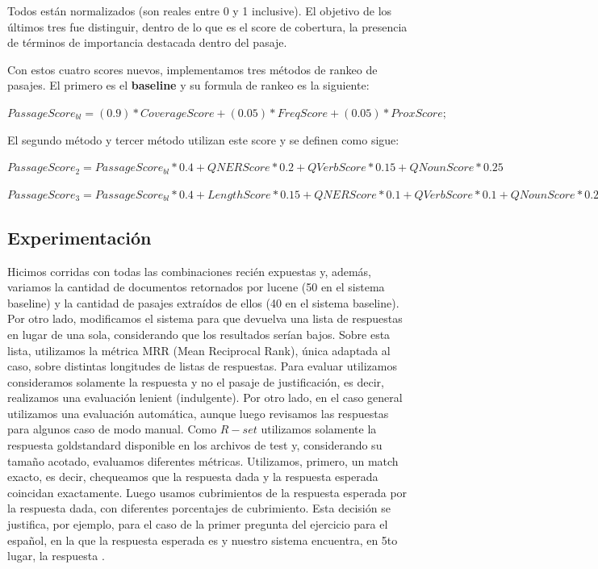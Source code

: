 Todos están normalizados (son reales entre 0 y 1 inclusive). El objetivo de los últimos tres fue distinguir, dentro de lo que es el score de cobertura, la presencia de términos de importancia destacada dentro del pasaje.


Con estos cuatro scores nuevos, implementamos tres métodos de rankeo de pasajes. El primero es el \textbf{baseline} y su formula de rankeo es la siguiente: \newline

$PassageScore_{bl} = (0.9)*CoverageScore + (0.05)*FreqScore+ (0.05)*ProxScore;$ \newline

El segundo método y tercer método utilizan este score y se definen como sigue:\newline

$PassageScore_2 =  PassageScore_{bl} * 0.4 + QNERScore * 0.2 + QVerbScore*0.15	+ QNounScore * 0.25 $\newline

$PassageScore_3 =  PassageScore_{bl} * 0.4 + LengthScore * 0.15 + QNERScore * 0.1 + QVerbScore*0.1	+ QNounScore * 0.25 $\newline


\subsection{Experimentación}
\label{sec:eval}

Hicimos corridas con todas las combinaciones recién expuestas y, además, variamos la cantidad de documentos retornados por lucene (50 en el sistema baseline) y la cantidad de pasajes extraídos de ellos (40 en el sistema baseline).  Por otro lado, modificamos el sistema para que devuelva una lista de respuestas en lugar de una sola, considerando que los resultados serían bajos. Sobre esta lista, utilizamos la métrica MRR (Mean Reciprocal Rank), única adaptada al caso, sobre distintas longitudes de listas de respuestas. Para evaluar utilizamos consideramos solamente la respuesta y no el pasaje de justificación, es decir, realizamos una evaluación lenient (indulgente). Por otro lado, en el caso general utilizamos una evaluación automática, aunque luego revisamos las respuestas para algunos caso de modo manual. Como $R-set$ utilizamos solamente la respuesta goldstandard disponible en los archivos de test y, considerando su tamaño acotado, evaluamos diferentes métricas. Utilizamos, primero, un match exacto, es decir, chequeamos que la respuesta dada y la respuesta esperada coincidan exactamente. Luego usamos cubrimientos de la respuesta esperada por la respuesta dada, con diferentes porcentajes de cubrimiento. Esta decisión se justifica, por ejemplo, para el caso de la primer pregunta del ejercicio para el español, en la que la respuesta esperada es  y nuestro sistema encuentra, en 5to lugar, la respuesta .

